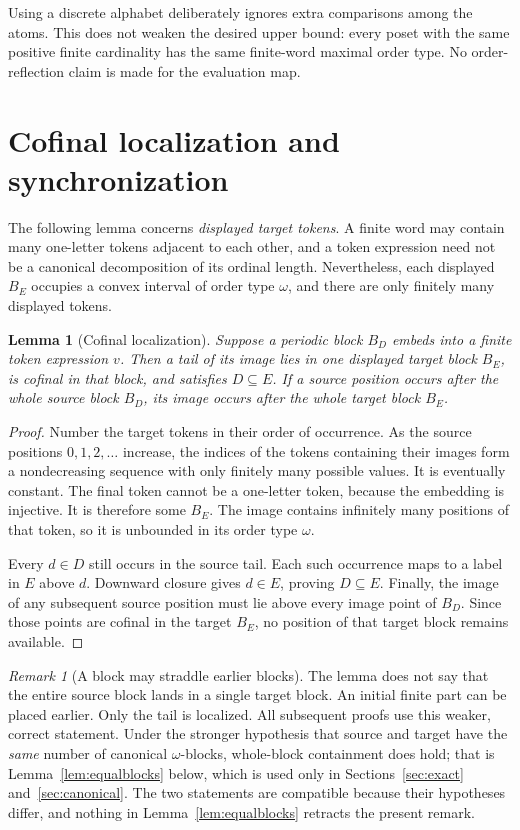 \documentclass[11pt,a4paper]{article}
\numberwithin{equation}{section}
\newtheorem{lemma}[theorem]{Lemma}
\theoremstyle{definition}
\theoremstyle{remark}
\newtheorem{remark}[theorem]{Remark}
\begin{document}
Using a discrete alphabet deliberately ignores extra comparisons among the
atoms. This does not weaken the desired upper bound: every poset with the
same positive finite cardinality has the same finite-word maximal order
type. No order-reflection claim is made for the evaluation map.

\section{Cofinal localization and synchronization}
\label{sec:sync}

The following lemma concerns \emph{displayed target tokens}. A finite word
may contain many one-letter tokens adjacent to each other, and a token
expression need not be a canonical decomposition of its ordinal length.
Nevertheless, each displayed $B_E$ occupies a convex interval of order type
$\omega$, and there are only finitely many displayed tokens.

\begin{lemma}[Cofinal localization]\label{lem:cofinal}
Suppose a periodic block $B_D$ embeds into a finite token expression $v$.
Then a tail of its image lies in one displayed target block $B_E$, is
cofinal in that block, and satisfies $D\subseteq E$.
If a source position occurs after the whole source block $B_D$, its image
occurs after the whole target block $B_E$.
\end{lemma}
\begin{proof}
Number the target tokens in their order of occurrence. As the source
positions $0,1,2,\ldots$ increase, the indices of the tokens containing
their images form a nondecreasing sequence with only finitely many
possible values. It is eventually constant. The final token cannot be a
one-letter token, because the embedding is injective. It is therefore
some $B_E$. The image contains infinitely many positions of that token,
so it is unbounded in its order type $\omega$.

Every $d\in D$ still occurs in the source tail. Each such occurrence maps
to a label in $E$ above $d$. Downward closure gives $d\in E$, proving
$D\subseteq E$. Finally, the image of any subsequent source position must
lie above every image point of $B_D$. Since those points are cofinal in the
target $B_E$, no position of that target block remains available.
\end{proof}

\begin{remark}[A block may straddle earlier blocks]\label{rem:straddle}
The lemma does not say that the entire source block lands in a single
target block. An initial finite part can be placed earlier. Only the tail
is localized. All subsequent proofs use this weaker, correct statement.
Under the stronger hypothesis that source and target have the \emph{same}
number of canonical $\omega$-blocks, whole-block containment does hold; that
is Lemma~\ref{lem:equalblocks} below, which is used only in
Sections~\ref{sec:exact} and~\ref{sec:canonical}. The two statements are
compatible because their hypotheses differ, and nothing in
Lemma~\ref{lem:equalblocks} retracts the present remark.
\end{remark}
\end{document}
